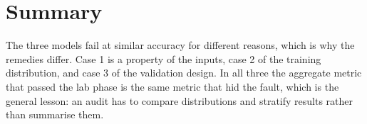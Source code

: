 \documentclass[10pt,a4paper,twocolumn]{article}
\begin{document}
\section{Summary}
The three models fail at similar accuracy for different reasons, which is why the remedies differ.
Case 1 is a property of the inputs, case 2 of the training distribution, and case 3 of the
validation design. In all three the aggregate metric that passed the lab phase is the same metric
that hid the fault, which is the general lesson: an audit has to compare distributions and stratify
results rather than summarise them.
\end{document}
